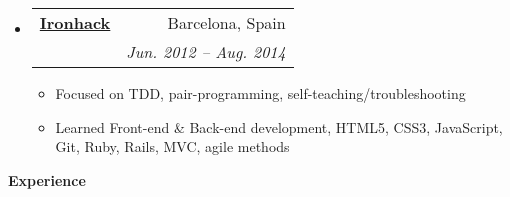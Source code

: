 \documentclass[letterpaper,11pt]{article}
\makeatletter
\newcommand{\resitem}[1]{\item #1 \vspace{-2pt}}
\newcommand{\resheading}[1]{{\large \colorbox{mygrey}{\begin{minipage}{\textwidth}{\textbf{#1 \vphantom{p\^{E}}}}\end{minipage}}}}
\newcommand{\ressubheading}[4]{
\begin{tabular*}{6.5in}{l@{\extracolsep{\fill}}r}
        \textbf{#1} & #2 \\
        \textit{#3} & \textit{#4} \\
\end{tabular*}\vspace{-6pt}}
\makeatother
\begin{document}
\begin{itemize}
{\begin{itemize}
            \end{itemize}
            }
        \item
        \ressubheading{\href{http://www.ntnu.edu/}{Ironhack}}{Barcelona, Spain}{\href{https://www.ironhack.com/en}{Intensive 8 week programming apprenticeship}; \href{}}{Jun. 2012 -- Aug. 2014}
            { \footnotesize
            \begin{itemize}
                \resitem{Focused on TDD, pair-programming, self-teaching/troubleshooting}
                \resitem{Learned Front-end \& Back-end development, HTML5, CSS3, JavaScript, Git, Ruby, Rails, MVC, agile methods}
            \end{itemize}
            }
    \end{itemize} %

\resheading{Experience}
\end{document}
